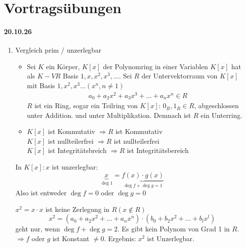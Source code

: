 \documentclass{article}
\begin{document}
\section{Vortragsübungen}
\paragraph{20.10.26}
\begin{enumerate}[1.]
    \item
        Vergleich prim / unzerlegbar
        \begin{itemize}
            \item
                Sei $K$ ein Körper, $K[x]$ der Polynomring
                in einer Variablen $K[x]$ hat als $K-VR$
                Basis $1,x,x^2,x^3,\hdots$. Sei $R$ der
                Untervektorraum von $K[x]$ mit Basis
                $1,x^2,x^3\hdots(x^n,n\neq 1)$
                \begin{align*}
                    a_0+a_2x^2+a_3x^3+\hdots+a_nx^n\in R
                \end{align*}
                $R$ ist ein Ring, sogar ein Teilring von
                $K[x]$: $0_R,1_R\in R$, abgeschlossen
                unter Addition. und unter Multiplikation.
                Demnach ist $R$ ein Unterring.
            \item
                $K[x]$ ist Kommutativ $\Rightarrow R$
                ist Kommutativ\\
                $K[x]$ ist nullteilerfrei $\Rightarrow R$
                ist nullteilerfrei\\
                $K[x]$ ist Integritätsbreich $\Rightarrow R$
                ist Integritätsbereich\\
        \end{itemize}
        In $K[x]: x$ ist unzerlegbar:
        \begin{equation*}
            \underbrace{x}_{\deg 1}=
            \underbrace{f(x)\cdot g(x)}_
            {\deg f+\deg g=1}
        \end{equation*}
        Also ist entweder $\deg f=0$ oder $\deg g=0$

        $x^2=x\cdot x$ ist keine Zerlegung in $R(x\notin R)$
        \begin{equation*}
            x^2=(a_0+a_2x^2+\hdots+a_nx^n)\cdot
            (b_0+b_2x^2+\hdots+b_lx^l)
        \end{equation*}
        geht nur, wenn $\deg f+\deg g=2$. Es gibt kein
        Polynom von Grad 1 in $R$.
        $\Rightarrow f$ oder $g$ ist Konstant $\neq 0$.
        Ergebnis: $x^2$ ist Unzerlegbar.


\end{enumerate}
\end{document}
